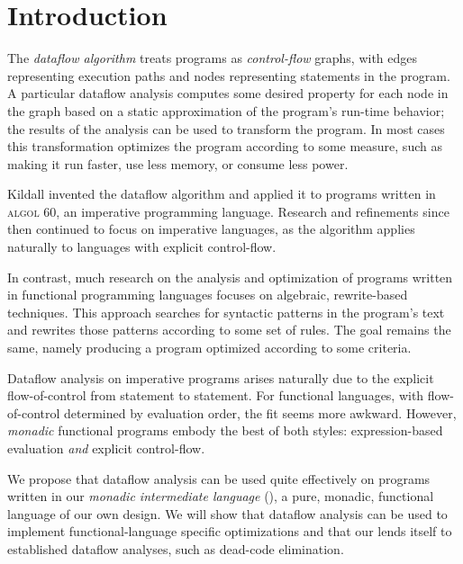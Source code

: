 \dodocclass



\chapter{Introduction}

The \emph{dataflow algorithm} treats programs as \emph{control-flow}
graphs, with edges representing execution paths and nodes representing
statements in the program. A particular dataflow analysis computes
some desired property for each node in the graph based on a static
approximation of the program's run-time behavior; the results of the
analysis can be used to transform the program. In most cases this
transformation optimizes the program according to some measure, such
as making it run faster, use less memory, or consume less power.

Kildall invented the dataflow algorithm \citep{Kildall1973} and applied it to
programs written in \textsc{algol 60},
an imperative programming language. Research and refinements since then
continued to focus on imperative languages, as the algorithm applies
naturally to languages with explicit control-flow.

 In
contrast, much research on the analysis and optimization of programs
written in functional programming languages focuses on algebraic,
rewrite-based techniques. This approach searches for syntactic
patterns in the program's text and rewrites those patterns according
to some set of rules. The goal remains the same, namely producing a
program optimized according to some criteria. 

Dataflow analysis on imperative programs arises naturally due to the
explicit flow-of-control from statement to statement. For functional
languages, with flow-of-control determined by evaluation order, the
fit seems more awkward. However, \emph{monadic} functional programs
embody the best of both styles: expression-based evaluation \emph{and}
explicit control-flow.

We propose that dataflow analysis can be used quite effectively on
programs written in our \emph{monadic intermediate language} (\mil), a
pure, monadic, functional language of our own design. We will show
that dataflow analysis can be used to implement functional-language
specific optimizations and that our \mil lends itself to established
dataflow analyses, such as dead-code elimination.

